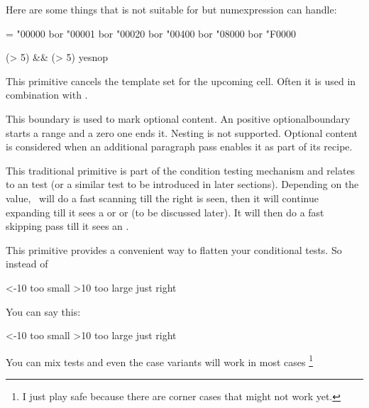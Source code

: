 \starttyping
{}
\stoptyping

Here are some things that  is not suitable for but \prm
{numexpression} can handle:

\starttyping
\scratchcounter = \numexpression
    "00000 bor "00001 bor "00020 bor "00400 bor "08000 bor "F0000
\relax

\ifcase \numexpression
    (\scratchcounterone > 5) && (\scratchcountertwo > 5)
\relax yes\else nop\fi
\stoptyping

\stopnewprimitive

\startoldprimitive[title={\prm {omit}}]

This primitive cancels the template set for the upcoming cell. Often it is used
in combination with .

\stopoldprimitive

\startnewprimitive[title={\prm {optionalboundary}}]

This boundary is used to mark optional content. An positive \prm
{optionalboundary} starts a range and a zero one ends it. Nesting is not
supported. Optional content is considered when an additional paragraph pass
enables it as part of its recipe.

\stopnewprimitive

\startoldprimitive[title={\prm {or}}]

This traditional primitive is part of the condition testing mechanism and relates
to an  test (or a similar test to be introduced in later
sections). Depending on the value, \TEX\ will do a fast scanning till the right
 is seen, then it will continue expanding till it sees a 
or  or  (to be discussed later). It will then do a
fast skipping pass till it sees an .

\stopoldprimitive

\startnewprimitive[title={\prm {orelse}}]

This primitive provides a convenient way to flatten your conditional tests. So
instead of

\starttyping
\ifnum\scratchcounter<-10
    too small
\else\ifnum\scratchcounter>10
    too large
\else
    just right
\fi\fi
\stoptyping

You can say this:

\starttyping
\ifnum\scratchcounter<-10
    too small
\orelse\ifnum\scratchcounter>10
    too large
\else
    just right
\fi
\stoptyping

You can mix tests and even the case variants will work in most cases \footnote {I
just play safe because there are corner cases that might not work yet.}


